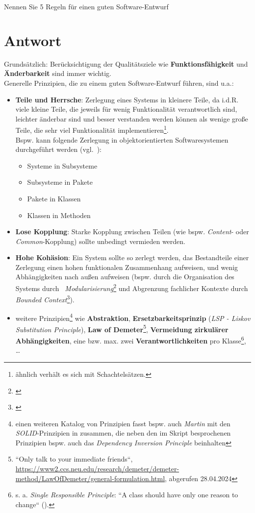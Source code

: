 Nennen Sie 5 Regeln für einen guten Software-Entwurf

\section*{Antwort}

Grundsätzlich: Berücksichtigung der Qualitätsziele wie \textbf{Funktionsfähigkeit} und \textbf{Änderbarkeit} sind immer wichtig.\\

\noindent
Generelle Prinzipien, die zu einem guten Software-Entwurf führen, sind u.a.:

\begin{itemize}
    \item \textbf{Teile und Herrsche}: Zerlegung eines Systems in kleinere Teile, da i.d.R. viele kleine Teile, die jeweils für wenig Funktionalität verantwortlich sind, leichter änderbar sind und besser verstanden werden können als wenige große Teile, die sehr viel Funktionalität implementieren\footnote{
    ähnlich verhält es sich mit Schachtelsätzen.
    }.\\
    Bspw. kann folgende Zerlegung in objektorientierten Softwaresystemen durchgeführt werden (vgl.~\cite[70]{Wed09b}):
        \begin{itemize}
            \item Systeme in Subsysteme
            \item Subsysteme in Pakete
            \item Pakete in Klassen
            \item Klassen in Methoden
        \end{itemize}
    \item \textbf{Lose Kopplung}: Starke Kopplung zwischen Teilen (wie bspw. \textit{Content}- oder \textit{Common}-Kopplung) sollte unbedingt vermieden werden.
    \item \textbf{Hohe Kohäsion}: Ein System sollte so zerlegt werden, das Bestandteile einer Zerlegung einen hohen funktionalen Zusammenhang aufweisen, und wenig Abhängigkeiten nach außen aufweisen (bspw. durch die Organisation des Systems durch ~\textit{Modularisierung}\footnote{
    \cite{Par72}
    } und Abgrenzung fachlicher Kontexte durch \textit{Bounded Context}\footnote{\cite[335 ff.]{Eva03}}).
    \item weitere Prinzipien\footnote{
    einen weiteren Katalog von Prinzipien fasst bspw. auch \textit{Martin} mit den \textit{SOLID}-Prinzipien in \cite{Mar03} zusammen, die neben den im Skript besprochenen Prinzipien bspw. auch das \textit{Dependency Inversion Principle} beinhalten
    } wie \textbf{Abstraktion}, \textbf{Ersetzbarkeitsprinzip} (\textit{LSP - Liskov Substitution Principle}), \textbf{Law of Demeter}\footnote{
        ``Only talk to your immediate friends``, \url{https://www2.ccs.neu.edu/research/demeter/demeter-method/LawOfDemeter/general-formulation.html}, abgerufen 28.04.2024
    }, \textbf{Vermeidung zirkulärer Abhängigkeiten}, eine bzw. max. zwei \textbf{Verantwortlichkeiten} pro Klasse\footnote{
    s. a. \textit{Single Responsible Principle}: ``A class should have only one reason to change`` (\cite[95 ff.]{Mar03}).
    }, \ldots
\end{itemize}